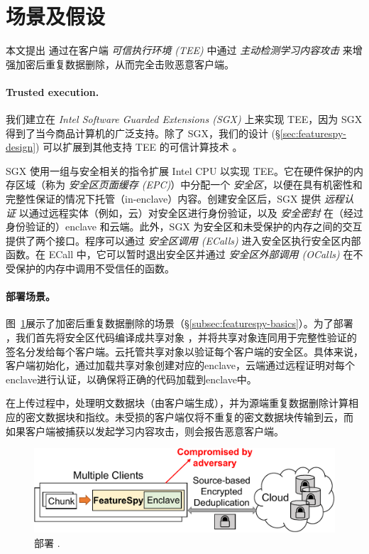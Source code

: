 \section{场景及假设}
\label{sec:featurespy-setting}
本文提出 \sysnameF 通过在客户端 {\em 可信执行环境 (TEE)} 中通过 {\em 主动检测学习内容攻击} 来增强加密后重复数据删除，从而完全击败恶意客户端。

\paragraph*{Trusted execution.} 我们建立在 {\em Intel Software Guarded Extensions (SGX)} \cite{sgx} 上来实现 TEE，因为 SGX 得到了当今商品计算机的广泛支持。除了 SGX，我们的设计 (\S\ref{sec:featurespy-design}) 可以扩展到其他支持 TEE 的可信计算技术 \cite{AMDSEV, pinto19}。

SGX 使用一组与安全相关的指令扩展 Intel CPU 以实现 TEE。它在硬件保护的内存区域（称为 {\em 安全区页面缓存 (EPC)}）中分配一个 {\em 安全区}，以便在具有机密性和完整性保证的情况下托管（in-enclave）内容。创建安全区后，SGX 提供 {\em 远程认证} 以通过远程实体（例如，云）对安全区进行身份验证，以及 {\em 安全密封} 在（经过身份验证的）enclave 和云端。此外，SGX 为安全区和未受保护的内存之间的交互提供了两个接口。程序可以通过 {\em 安全区调用 (ECalls)} 进入安全区执行安全区内部函数。在 ECall 中，它可以暂时退出安全区并通过 {\em 安全区外部调用 (OCalls)} 在不受保护的内存中调用不受信任的函数。



\paragraph*{部署场景。}图~\ref{fig:featurespy-model}展示了加密后重复数据删除的场景（\S\ref{subsec:featurespy-basics}）。为了部署 \sysnameF，我们首先将安全区代码编译成共享对象 \cite{sgx}，并将共享对象连同用于完整性验证的签名分发给每个客户端。云托管共享对象以验证每个客户端的安全区。具体来说，客户端初始化\sysnameF，通过加载共享对象创建对应的enclave，云端通过远程证明\cite{sgx}对每个enclave进行认证，以确保将正确的代码加载到enclave中。

在上传过程中，\sysnameF 处理明文数据块（由客户端生成），并为源端重复数据删除计算相应的密文数据块和指纹。未受损的客户端仅将不重复的密文数据块传输到云，而 \sysnameF 如果客户端被捕获以发起学习内容攻击，则会报告恶意客户端。

\begin{figure}
    \centering
    \includegraphics[width=\textwidth]{pic/featurespy/deployment.pdf}
    \vspace{-6pt}
    \caption{部署 \sysnameF.}
    \label{fig:featurespy-model}
    \vspace{-6pt}
\end{figure}

